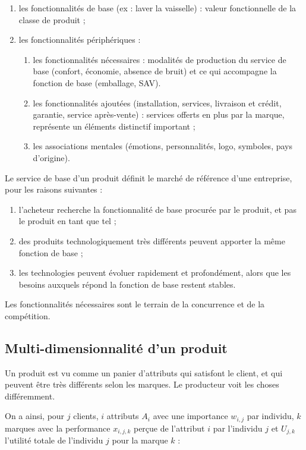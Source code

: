 	\begin{enumerate}
		\item les fonctionnalités de base (ex : laver la vaisselle) : valeur fonctionnelle de la classe de produit ;
	
		\item les fonctionnalités périphériques :
	
		\begin{enumerate}
			\item les fonctionnalités nécessaires : modalités de production du service de base (confort, économie, absence de bruit) et ce qui accompagne la fonction de base (emballage, SAV).
			\item les fonctionnalités ajoutées (installation, services, livraison et crédit, garantie, service après-vente) : services offerts en plus par la marque, représente un éléments distinctif important ;
			\item les associations mentales (émotions, personnalités, logo, symboles, pays d'origine).
		\end{enumerate}
	\end{enumerate}
	\n
	Le service de base d'un produit définit le marché de référence d'une entreprise, pour les raisons suivantes : 

	\begin{enumerate}
		\item l'acheteur recherche la fonctionnalité de base procurée par le produit, et pas le produit en tant que tel ;
		\item des produits technologiquement très différents peuvent apporter la même fonction de base ;
		\item les technologies peuvent évoluer rapidement et profondément, alors que les besoins auxquels répond la fonction de base restent stables.
	\end{enumerate}
	\n
	Les fonctionnalités nécessaires sont le terrain de la concurrence et de la compétition.

		\subsection{Multi-dimensionnalité d'un produit}
		
		Un produit est vu comme un panier d'attributs qui satisfont le client, et qui peuvent être très différents selon les marques. Le producteur voit les choses différemment.
		
		
		On a ainsi, pour $j$ clients, $i$ attributs $A_i$ avec une importance $w_{i,j}$ par individu, $k$ marques avec la performance $x_{i, j, k}$ perçue de l'attribut $i$ par l'individu $j$ et $U_{j, k}$ l'utilité totale de l'individu $j$ pour la marque $k$ : 
		

